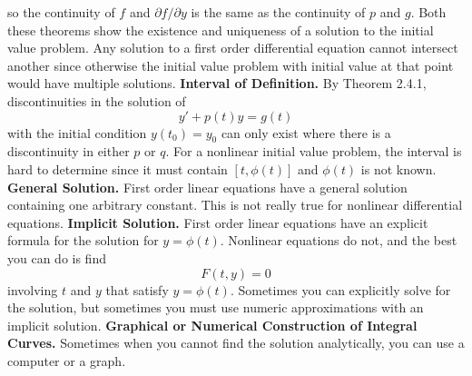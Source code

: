     so the continuity of $f$ and $\partial f / \partial y$ is the same as the continuity of $p$ and $g$.
    \newline \indent
    Both these theorems show the existence and uniqueness of a solution to the initial value problem. Any solution to a first order differential equation cannot intersect another since otherwise the initial value problem with initial value at that point would have multiple solutions.
    \newline
    \textbf{Interval of Definition. } By Theorem 2.4.1, discontinuities in the solution of 
    \begin{equation*}
        y' + p(t)y = g(t)
    \end{equation*}
    with the initial condition $y(t_0) = y_0$ can only exist where there is a discontinuity in either $p$ or $q$.
    \newline \indent 
    For a nonlinear initial value problem, the interval is hard to determine since it must contain $[t, \phi(t)]$ and $\phi(t)$ is not known.
    \newline
    \textbf{General Solution.} First order linear equations have a general solution containing one arbitrary constant. This is not really true for nonlinear differential equations.
    \newline
    \textbf{Implicit Solution. } First order linear equations have an explicit formula for the solution for $y = \phi(t)$. Nonlinear equations do not, and the best you can do is find
    \begin{equation*}
        F(t, y) = 0
    \end{equation*}
    involving $t$ and $y$ that satisfy $y = \phi(t)$. Sometimes you can explicitly solve for the solution, but sometimes you must use numeric approximations with an implicit solution.
    \newline
    \textbf{Graphical or Numerical Construction of Integral Curves.} Sometimes when you cannot find the solution analytically, you can use a computer or a graph.